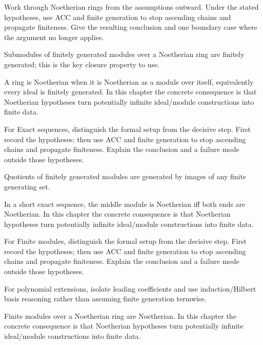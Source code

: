 \begin{exercise}\label{exr:v15-03}
Work through Noetherian rings from the assumptions outward. Under the stated hypotheses, use ACC and finite generation to stop ascending chains and propagate finiteness. Give the resulting conclusion and one boundary case where the argument no longer applies.
\end{exercise}
\begin{hint}
Submodules of finitely generated modules over a Noetherian ring are finitely generated; this is the key closure property to use.
\end{hint}
\begin{solution}
A ring is Noetherian when it is Noetherian as a module over itself, equivalently every ideal is finitely generated. In this chapter the concrete consequence is that Noetherian hypotheses turn potentially infinite ideal/module constructions into finite data.
\end{solution}

\begin{exercise}\label{exr:v15-04}
For Exact sequences, distinguish the formal setup from the decisive step. First record the hypotheses; then use ACC and finite generation to stop ascending chains and propagate finiteness. Explain the conclusion and a failure mode outside those hypotheses.
\end{exercise}
\begin{hint}
Quotients of finitely generated modules are generated by images of any finite generating set.
\end{hint}
\begin{solution}
In a short exact sequence, the middle module is Noetherian iff both ends are Noetherian. In this chapter the concrete consequence is that Noetherian hypotheses turn potentially infinite ideal/module constructions into finite data.
\end{solution}

\begin{exercise}\label{exr:v15-05}
For Finite modules, distinguish the formal setup from the decisive step. First record the hypotheses; then use ACC and finite generation to stop ascending chains and propagate finiteness. Explain the conclusion and a failure mode outside those hypotheses.
\end{exercise}
\begin{hint}
For polynomial extensions, isolate leading coefficients and use induction/Hilbert basis reasoning rather than assuming finite generation termwise.
\end{hint}
\begin{solution}
Finite modules over a Noetherian ring are Noetherian. In this chapter the concrete consequence is that Noetherian hypotheses turn potentially infinite ideal/module constructions into finite data.
\end{solution}

